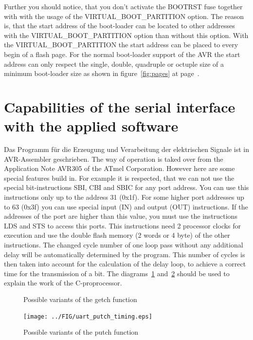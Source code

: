 Further you should notice, that you don't activate the BOOTRST fuse together with
with the usage of the VIRTUAL\_BOOT\_PARTITION option.
The reason is, that the start address of the boot-loader can be located to other
addresses with the VIRTUAL\_BOOT\_PARTITION option than without this option.
With the VIRTUAL\_BOOT\_PARTITION the start address can be placed to every
begin of a flash page. For the normal boot-loader support of the AVR the
start address can only respect the single, double, quadruple or octuple size of
a minimum boot-loader size as shown in figure~\ref{fig:pages} at page~\pageref{fig:pages}.


\section{Capabilities of the serial interface with the applied software}

Das Programm für die Erzeugung und Verarbeitung der elektrischen Signale ist in AVR-Assembler geschrieben.
The way of operation is taked over from the Application Note AVR305 of the ATmel Corporation.
However here are some special features build in.
For example it is respected, that we can not use the special bit-instructions SBI, CBI and SBIC for
any port address. You can use this instructions only up to the address 31 (0x1f).
For some higher port addresses up to 63 (0x3f) you can use special input (IN) and output (OUT)
instructions. If the addresses of the port are higher than this value, you must use
the instructions LDS and STS to access this ports. This instructions need 2 processor clocks for
execution and use the double flash memory (2 words or 4 byte) of the other instructions.
The changed cycle number of one loop pass without any additional delay will be automatically
determined by the program. 
This number of cycles is then taken into account for the calculation of the delay loop,
to achieve a correct time for the transmission of a bit.
The diagrams~\ref{fig:getch_timing} and~\ref{fig:putch_timing} should be used to
explain the work of the C-proprocessor.

\begin{figure}[H]
\centering
{}
\caption{Possible variants of the getch function}
\label{fig:getch_timing}
\end{figure}


\begin{figure}[H]
\centering
\texttt{[image: ../FIG/uart\_putch\_timing.eps]}
\caption{Possible variants of the putch function}
\label{fig:putch_timing}
\end{figure}

